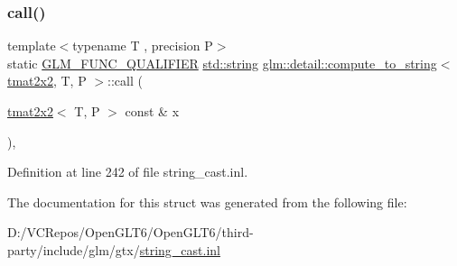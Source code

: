 \subsubsection{\texorpdfstring{call()}{call()}}
{\footnotesize\ttfamily template$<$typename T , precision P$>$ \\
static \mbox{\hyperlink{setup_8hpp_a33fdea6f91c5f834105f7415e2a64407}{G\+L\+M\+\_\+\+F\+U\+N\+C\+\_\+\+Q\+U\+A\+L\+I\+F\+I\+ER}} \mbox{\hyperlink{glad_8h_ac83513893df92266f79a515488701770}{std\+::string}} \mbox{\hyperlink{structglm_1_1detail_1_1compute__to__string}{glm\+::detail\+::compute\+\_\+to\+\_\+string}}$<$ \mbox{\hyperlink{structglm_1_1tmat2x2}{tmat2x2}}, T, P $>$\+::call (\begin{DoxyParamCaption}\item[{\mbox{\hyperlink{structglm_1_1tmat2x2}{tmat2x2}}$<$ T, P $>$ const \&}]{x }\end{DoxyParamCaption})\hspace{0.3cm}{\ttfamily [inline]}, {\ttfamily [static]}}



Definition at line 242 of file string\+\_\+cast.\+inl.



The documentation for this struct was generated from the following file\+:\begin{DoxyCompactItemize}
\item 
D\+:/\+V\+C\+Repos/\+Open\+G\+L\+T6/\+Open\+G\+L\+T6/third-\/party/include/glm/gtx/\mbox{\hyperlink{string__cast_8inl}{string\+\_\+cast.\+inl}}\end{DoxyCompactItemize}
